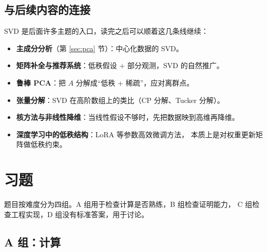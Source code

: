 \documentclass[UTF8, 11pt, a4paper, fontset=windows]{ctexart}
\theoremstyle{cnthm}
\theoremstyle{cndef}
\begin{document}
\subsection{与后续内容的连接}

SVD 是后面许多主题的入口，读完之后可以顺着这几条线继续：

\begin{itemize}
  \item \textbf{主成分分析}（第 \ref{sec:pca} 节）：中心化数据的 SVD。
  \item \textbf{矩阵补全与推荐系统}：低秩假设 + 部分观测，SVD 的自然推广。
  \item \textbf{鲁棒 PCA}：把 $A$ 分解成“低秩 + 稀疏”，应对离群点。
  \item \textbf{张量分解}：SVD 在高阶数组上的类比（CP 分解、Tucker 分解）。
  \item \textbf{核方法与非线性降维}：当线性假设不够时，先把数据映到高维再降维。
  \item \textbf{深度学习中的低秩结构}：LoRA 等参数高效微调方法，
        本质上是对权重更新矩阵做低秩约束。
\end{itemize}

\section{习题}\label{sec:exercises}

题目按难度分为四组。A 组用于检查计算是否熟练，B 组检查证明能力，
C 组检查工程实现，D 组没有标准答案，用于讨论。

\subsection*{A 组：计算}
\end{document}
